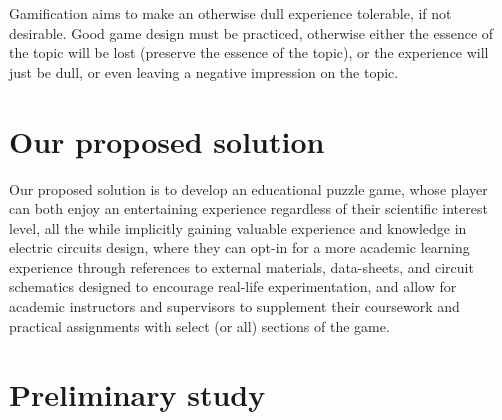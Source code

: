 \documentclass[twoside,a4paper,11pt]{article}
\begin{document}
\begin{multicols}{2}
Gamification aims to make an otherwise dull experience tolerable, if not desirable. Good game design must be practiced, otherwise either the essence of the topic will be lost (preserve the essence of the topic), or the experience will just be dull, or even leaving a negative impression on the topic.

\section{Our proposed solution}

Our proposed solution is to develop an educational puzzle game, whose player can both enjoy an entertaining experience regardless of their scientific interest level, all the while implicitly gaining valuable experience and knowledge in electric circuits design, where they can opt-in for a more academic learning experience through references to external materials, data-sheets, and circuit schematics designed to encourage real-life experimentation, and allow for academic instructors and supervisors to supplement their coursework and practical assignments with select (or all) sections of the game.
\section{Preliminary study}

\end{multicols}
\end{document}
